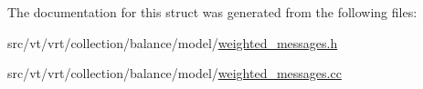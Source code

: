 The documentation for this struct was generated from the following files\+:\begin{DoxyCompactItemize}
\item 
src/vt/vrt/collection/balance/model/\hyperlink{weighted__messages_8h}{weighted\+\_\+messages.\+h}\item 
src/vt/vrt/collection/balance/model/\hyperlink{weighted__messages_8cc}{weighted\+\_\+messages.\+cc}\end{DoxyCompactItemize}
